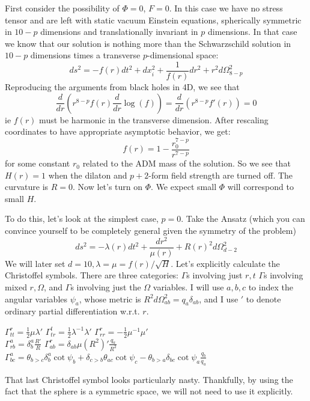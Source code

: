 \documentclass[11pt, class=article, crop=false]{standalone}
\begin{document}
\begin{enumerate}
	First consider the possibility of $\Phi = 0$, $F = 0$. In this case we have no stress tensor and are left with static vacuum Einstein equations, spherically symmetric in $10-p$ dimensions and translationally invariant in $p$ dimensions. In that case we know that our solution is nothing more than the Schwarzschild solution in $10-p$ dimensions times a transverse $p$-dimensional space:
	\[
		ds^2 = - f(r) dt^2 + dx_i^2 + \frac{1}{f(r)} dr^2 + r^2 d\Omega_{8-p}^2
	\]
	Reproducing the arguments from black holes in 4D, we see that 
	\[
		\frac{d}{dr} (r^{8-p} f(r) \frac{d}{dr} \log(f)) = \frac{d}{dr}(r^{8-p} f'(r)) = 0 
	\]
	ie $f(r)$ must be harmonic in the transverse dimension. After rescaling coordinates to have appropriate asymptotic behavior, we  get:
	\[
		f(r)  = 1 - \frac{r_0^{7-p}}{r^{7-p}}
	\]
	for some constant $r_0$ related to the ADM mass of the solution. So we see that $H(r) = 1$ when the dilaton and $p+2$-form field strength are turned off. The curvature is $R = 0$. Now let's turn on $\Phi$. We expect small $\Phi$ will correspond to small $H$. 
	
	To do this, let's look at the simplest case, $p=0$. Take the Ansatz (which you can convince yourself to be completely general given the symmetry of the problem)
	\[
		ds^2 = - \lambda(r) dt^2 + \frac{dr^2}{\mu(r)} + R(r)^2 d\Omega_{d-2}^2
	\]
	We will later set $d=10, \lambda = \mu = f(r)/\sqrt{H}$. Let's explicitly calculate the Christoffel symbols. There are three categories: $\Gamma$s involving just $r, t$ $\Gamma$s involving mixed $r, \Omega$, and $\Gamma$s involving just the $\Omega$ variables. I will use $a,b,c$ to index the angular variables $\psi_a$, whose metric is $R^2 d\Omega^2_{ab} = q_{a} \delta_{ab}$, and I use $'$ to denote ordinary partial differentiation w.r.t. $r$. 
	\begin{center}
			$\Gamma^r_{tt} = \frac12 \mu \lambda'$  \qquad $\Gamma^t_{tr} = \frac12 \lambda^{-1} \lambda'$ \qquad $\Gamma^r_{rr} = -\frac12 \mu^{-1} \mu'$\\
			$\Gamma^a_{rb} = \delta^a_b \frac{R'}{R}$ \qquad $\Gamma^r_{ab} = \delta_{ab} \mu (R^2)' \frac{q_a}{R^2}$ \\
			
		$\Gamma^{a}_{bc} = \theta_{b>c} \delta^a_b \cot \psi_b +  \delta_{c>b} \theta_{ac} \cot \psi_c - \theta_{b>a} \delta_{bc} \cot \psi_a \frac{q_b}{q_a}$
	\end{center}
	That last Christoffel symbol looks particularly nasty. Thankfully, by using the fact that the sphere is a symmetric space, we will not need to use it explicitly. 
	

\end{enumerate}
\end{document}
